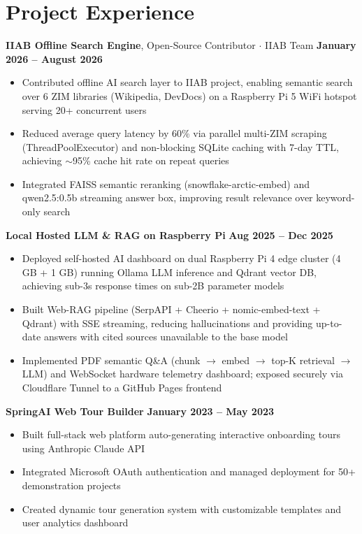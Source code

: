 \documentclass[9.5pt, letterpaper]{article}
\begin{document}
\section{Project Experience}
\textbf{IIAB Offline Search Engine}, Open-Source Contributor $\cdot$ IIAB Team \hfill \textbf{January 2026 -- August 2026}
\begin{itemize}[leftmargin=0.5cm, itemsep=0.05cm, topsep=0.05cm, parsep=0pt]
    \item Contributed offline AI search layer to IIAB project, enabling semantic search over 6 ZIM libraries (Wikipedia, DevDocs) on a Raspberry Pi 5 WiFi hotspot serving 20+ concurrent users
    \item Reduced average query latency by 60\% via parallel multi-ZIM scraping (ThreadPoolExecutor) and non-blocking SQLite caching with 7-day TTL, achieving $\sim$95\% cache hit rate on repeat queries
    \item Integrated FAISS semantic reranking (snowflake-arctic-embed) and qwen2.5:0.5b streaming answer box, improving result relevance over keyword-only search
\end{itemize}
\vspace{0.05cm}
\textbf{Local Hosted LLM \& RAG on Raspberry Pi} \hfill \textbf{Aug 2025 -- Dec 2025}
\begin{itemize}[leftmargin=0.5cm, itemsep=0.05cm, topsep=0.05cm, parsep=0pt]
    \item Deployed self-hosted AI dashboard on dual Raspberry Pi 4 edge cluster (4 GB + 1 GB) running Ollama LLM inference and Qdrant vector DB, achieving sub-3s response times on sub-2B parameter models
    \item Built Web-RAG pipeline (SerpAPI + Cheerio + nomic-embed-text + Qdrant) with SSE streaming, reducing hallucinations and providing up-to-date answers with cited sources unavailable to the base model
    \item Implemented PDF semantic Q\&A (chunk $\rightarrow$ embed $\rightarrow$ top-K retrieval $\rightarrow$ LLM) and WebSocket hardware telemetry dashboard; exposed securely via Cloudflare Tunnel to a GitHub Pages frontend
\end{itemize}
\vspace{0.05cm}
\textbf{SpringAI Web Tour Builder}  \hfill \textbf{January 2023 -- May 2023}
\begin{itemize}[leftmargin=0.5cm, itemsep=0.05cm, topsep=0.05cm, parsep=0pt]
    \item Built full-stack web platform auto-generating interactive onboarding tours using Anthropic Claude API
    \item Integrated Microsoft OAuth authentication and managed deployment for 50+ demonstration projects
    \item Created dynamic tour generation system with customizable templates and user analytics dashboard
\end{itemize}
\end{document}
